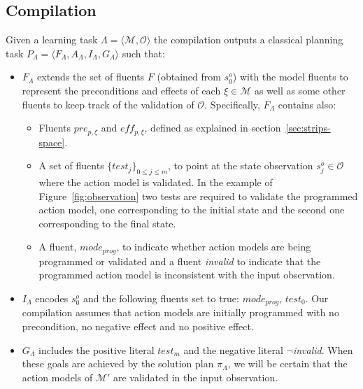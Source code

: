 \documentclass[runningheads]{llncs}
\newcommand{\tup}[1]{{\langle #1 \rangle}}
\begin{document}
\subsection{Compilation}
Given a learning task $\Lambda=\tup{\mathcal{M},{\mathcal O}}$ the compilation outputs a classical planning task $P_{\Lambda}=\tup{F_{\Lambda},A_{\Lambda},I_{\Lambda},G_{\Lambda}}$ such that:
\begin{itemize}
\item $F_{\Lambda}$ extends the set of fluents $F$ (obtained from $s_0^o$) with the model fluents to represent the preconditions and effects of each $\xi\in\mathcal{M}$ as well as some other fluents to keep track of the validation of ${\mathcal O}$. Specifically, $F_{\Lambda}$ contains also:
\begin{itemize}
\item Fluents $pre_{p,\xi}$ and $eff_{p,\xi}$, defined as explained in section~\ref{sec:strips-space}.
\item A set of fluents $\{test_j\}_{0\leq j\leq m}$, to point at the state observation $s_j^o\in {\mathcal O}$ where the action model is validated. In the example of Figure~\ref{fig:observation} two tests are required to validate the programmed action model, one corresponding to the initial state and the second one corresponding to the final state.  
\item A fluent, $mode_{prog}$, to indicate whether action models are being programmed or validated and a fluent {\em invalid} to indicate that the programmed action model is inconsistent with the input observation.
\end{itemize}

\item $I_{\Lambda}$ encodes $s_0^o$ and the following fluents set to true: $mode_{prog}$, $test_0$. Our compilation assumes that action models are initially programmed with no precondition, no negative effect and no positive effect.

\item $G_{\Lambda}$ includes the positive literal $test_m$ and the negative literal $\neg${\em invalid}. When these goals are achieved by the solution plan $\pi_\Lambda$, we will be certain that the action models of $\mathcal{M'}$ are validated in the input observation.


\end{itemize}
\end{document}

